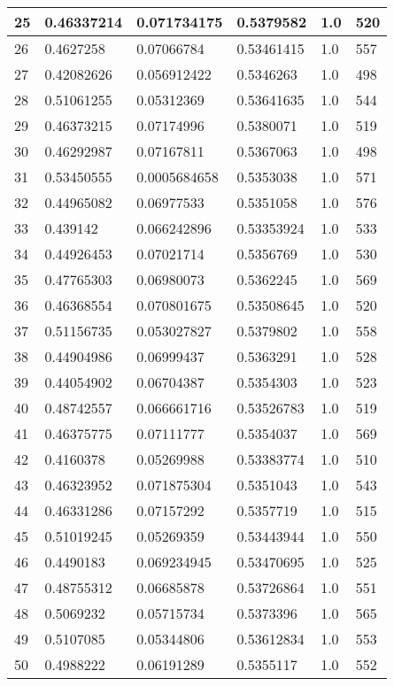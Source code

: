 \begin{longtable}{|l|l|l|l|l|l|}
25 & 0.46337214 & 0.071734175 & 0.5379582 & 1.0 & 520 \\ \hline 
26 & 0.4627258 & 0.07066784 & 0.53461415 & 1.0 & 557 \\ \hline 
27 & 0.42082626 & 0.056912422 & 0.5346263 & 1.0 & 498 \\ \hline 
28 & 0.51061255 & 0.05312369 & 0.53641635 & 1.0 & 544 \\ \hline 
29 & 0.46373215 & 0.07174996 & 0.5380071 & 1.0 & 519 \\ \hline 
30 & 0.46292987 & 0.07167811 & 0.5367063 & 1.0 & 498 \\ \hline 
31 & 0.53450555 & 0.0005684658 & 0.5353038 & 1.0 & 571 \\ \hline 
32 & 0.44965082 & 0.06977533 & 0.5351058 & 1.0 & 576 \\ \hline 
33 & 0.439142 & 0.066242896 & 0.53353924 & 1.0 & 533 \\ \hline 
34 & 0.44926453 & 0.07021714 & 0.5356769 & 1.0 & 530 \\ \hline 
35 & 0.47765303 & 0.06980073 & 0.5362245 & 1.0 & 569 \\ \hline 
36 & 0.46368554 & 0.070801675 & 0.53508645 & 1.0 & 520 \\ \hline 
37 & 0.51156735 & 0.053027827 & 0.5379802 & 1.0 & 558 \\ \hline 
38 & 0.44904986 & 0.06999437 & 0.5363291 & 1.0 & 528 \\ \hline 
39 & 0.44054902 & 0.06704387 & 0.5354303 & 1.0 & 523 \\ \hline 
40 & 0.48742557 & 0.066661716 & 0.53526783 & 1.0 & 519 \\ \hline 
41 & 0.46375775 & 0.07111777 & 0.5354037 & 1.0 & 569 \\ \hline 
42 & 0.4160378 & 0.05269988 & 0.53383774 & 1.0 & 510 \\ \hline 
43 & 0.46323952 & 0.071875304 & 0.5351043 & 1.0 & 543 \\ \hline 
44 & 0.46331286 & 0.07157292 & 0.5357719 & 1.0 & 515 \\ \hline 
45 & 0.51019245 & 0.05269359 & 0.53443944 & 1.0 & 550 \\ \hline 
46 & 0.4490183 & 0.069234945 & 0.53470695 & 1.0 & 525 \\ \hline 
47 & 0.48755312 & 0.06685878 & 0.53726864 & 1.0 & 551 \\ \hline 
48 & 0.5069232 & 0.05715734 & 0.5373396 & 1.0 & 565 \\ \hline 
49 & 0.5107085 & 0.05344806 & 0.53612834 & 1.0 & 553 \\ \hline 
50 & 0.4988222 & 0.06191289 & 0.5355117 & 1.0 & 552 \\ \hline 
\end{longtable}